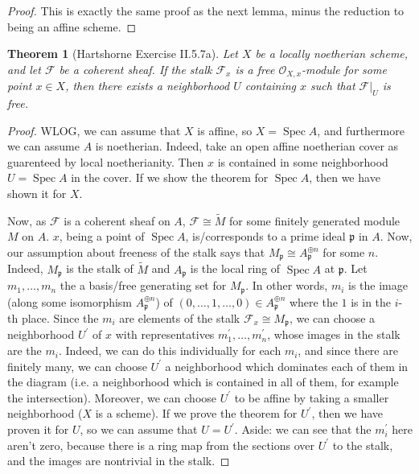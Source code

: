 \documentclass[a4paper]{article}
\newtheorem{thm}{Theorem}[section]
\newcommand{\isom}{\cong}
\newcommand{\Spec}{\operatorname{Spec}}
\begin{document}
\begin{proof}
	This is exactly the same proof
	as the next lemma, minus the reduction
	to being an affine scheme.
\end{proof}


\begin{thm}
	[Hartshorne Exercise II.5.7a]
	Let \(X\) be a locally noetherian scheme, and let
	\(\mathcal{F}\) be a coherent sheaf. 
	If the stalk \(\mathcal{F}_{x}\) is a free
	\(\mathcal{O}_{X,x} \)-module for some point
	\(x \in X\), then there exists
	a neighborhood \(U\) containing \(x\) such that
	\(\mathcal{F}|_{U}\) is free.
\end{thm}

\begin{proof}
	WLOG, we can assume that \(X\) is affine, so 
	\(X = \Spec A\), and furthermore we can assume
	\(A\) is noetherian.
	Indeed, take an open affine noetherian cover 
	as guarenteed by local noetherianity. 
	Then \(x\) is contained in some neighborhood
	\(U = \Spec A\) in the cover. 
	If we show the theorem for \(\Spec A\),
	then we have shown it for \(X\).

	Now, as \(\mathcal{F}\) is a coherent sheaf on 
	\(A\), \(\mathcal{F} \isom \tilde{M}\) for some
	finitely generated module \(M\) on \(A\).
	\(x\), being a point of \(\Spec A\), 
	is/corresponds to a prime
	ideal \(\mathfrak{p}\) in \(A\).
	Now, our assumption about
	freeness of the stalk says that
	\(M_{\mathfrak{p}} \isom A_{\mathfrak{p}}^{\oplus n}\) 
	for some \(n\).
	Indeed, \(M_{\mathfrak{p}}\) is the stalk of 
	\(\tilde{M}\) and \(A_{\mathfrak{p}}\) is the local
	ring of \(\Spec A\) at \(\mathfrak{p}\).
	Let \(m_{1} , \ldots , m_{n}\) the a 
	basis/free generating set for \(M_{\mathfrak{p}}\).
	In other words, \(m_{i}\) is the image 
	(along
	some isomorphism \(A_{\mathfrak{p}}^{\oplus n}\)) of
	\((0, \ldots, 1, \ldots, 0) \in A_{\mathfrak{p}}^{\oplus n}\)
	where the \(1\) is in the \(i\)-th place.
	Since the \(m_{i}\) are elements of the stalk 
	\(\mathcal{F}_{x} \isom M_{\mathfrak{p}}\),
	we can choose a neighborhood \(U^{\prime}\) of \(x\) with 
	representatives \(m_{1}^{\prime}, \ldots, m_{n}^{\prime}\),
	whose images in the stalk are the \(m_{i}\).
	Indeed, we can do this individually for each \(m_{i}\),
	and since there are finitely many, 
	we can choose \(U^{\prime}\) a neighborhood which dominates each of them in 
	the diagram (i.e. a neighborhood which is contained in
	all of them, for example the intersection).
	Moreover, we can choose \(U^{\prime}\) to be affine by taking a 
	smaller neighborhood (\(X\) is a scheme).
	If we prove the theorem for \(U^{\prime}\), then we 
	have proven it for \(U\),
	so we can assume that \(U = U^{\prime}\).
	Aside: we can see that the \(m_{i}^{\prime}\) here aren't
	zero, because there is a ring map from the sections over
	\(U^{\prime}\) to the stalk, and the images are nontrivial in the stalk.



\end{proof}
\end{document}
